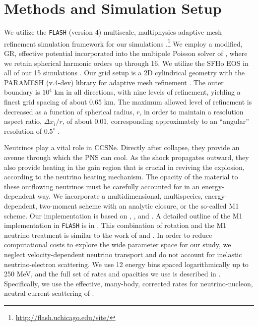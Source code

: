 \documentclass[twocolumn,times]{aastex62}  %
\begin{document}

\section{Methods and Simulation Setup}
\label{sec:method}
We utilize the \texttt{FLASH} (version 4) multiscale, multiphysics adaptive mesh refinement simulation framework for our simulations \citep{fryxell:2000,dubey:2009}.\footnote[7]{\url{http://flash.uchicago.edu/site/}}  We employ a modified, GR, effective potential \citep{marek:2006, oconnor:2018} incorporated into the multipole Poisson solver of \citet{couch:2013a}, where we retain spherical harmonic orders up through 16.   We utilize the SFHo EOS in all of our 15 simulations \citep{steiner:2013}.  Our grid setup is a 2D cylindrical geometry with the PARAMESH (v.4-dev) library for adaptive mesh refinement  \citep{macneice:2000}.  The outer boundary is $10^4$ km in all directions, with nine levels of refinement, yielding a finest grid spacing of about 0.65 km.
The maximum allowed level of refinement is decreased as a function of spherical radius, $r$, in order to maintain a resolution aspect ratio, $\Delta x_i / r$, of about 0.01, corresponding approximately to an ``angular'' resolution of $0.5^{\circ}$ .

Neutrinos play a vital role in CCSNe.  Directly after collapse, they provide an avenue through which the PNS can cool.  As the shock propagates outward, they also provide heating in the gain region that is crucial in reviving the explosion, according to the neutrino heating mechanism.  The opacity of the material to these outflowing neutrinos must be carefully accounted for in an energy-dependent way.  We incorporate a multidimensional, multispecies, energy-dependent, two-moment scheme with an analytic closure, or the so-called M1 scheme.  Our implementation is based on \citet{oconnor:2015}, \citet{shibata:2011}, and \citet{cardall:2013}.  A detailed outline of the M1 implementation in \texttt{FLASH} is in \citet{oconnor:2018}.  This combination of rotation and the M1 neutrino treatment is similar to the work of \citet{obergaulinger:2017} and \citet{obergaulinger:2018}.  In order to reduce computational costs to explore the wide parameter space for our study, we neglect velocity-dependent neutrino transport and do not account for inelastic neutrino-electron scattering.
We use 12 energy bins spaced logarithmically up to 250 MeV, and the full set of rates and opacities we use is described in \citet{oconnor:2017a}. 
Specifically, we use the effective, many-body, corrected rates
for neutrino-nucleon, neutral current scattering of \citet{horowitz:2017}.  
\end{document}
